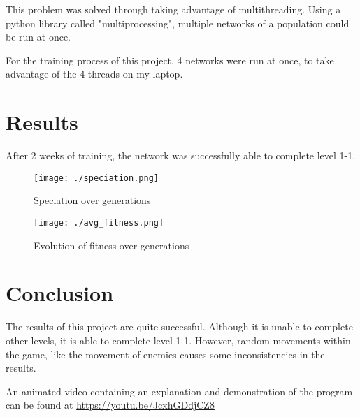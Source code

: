 \documentclass[11pt]{article}
\begin{document}
\begin{multicols}{2}
This problem was solved through taking advantage of multithreading. Using a python library
called "multiprocessing", multiple networks of a population could be run at once.

For the training process of this project, 4 networks were run at once, to take advantage of the
4 threads on my laptop.
\section{Results}
After 2 weeks of training, the network was successfully able to complete level 1-1.
\begin{figure}[H]
\centering
\texttt{[image: ./speciation.png]}
\caption{\label{fig:posvsfreq}
Speciation over generations
}
\end{figure}   
\begin{figure}[H]
\centering
\texttt{[image: ./avg\_fitness.png]}
\caption{\label{fig:posvsfreq}
Evolution of fitness over generations
}
\end{figure}   
\label{sec:org70c3ecf}
\section{Conclusion}
\label{sec:org9f73321}
The results of this project are quite successful.
Although it is unable to complete other levels, it is able 
to complete level 1-1. However, random movements within the game, like the movement of enemies causes some inconsistencies
in the results.

An animated video containing an explanation and demonstration of the program can be found
at \url{https://youtu.be/JcxhGDdjCZ8}

\end{multicols}
\end{document}
